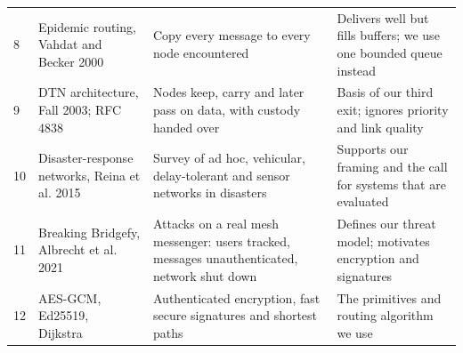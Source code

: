 \begin{longtable}{@{}p{0.5cm}>{\raggedright\arraybackslash}p{3.5cm}p{6.3cm}p{6.0cm}@{}}
8 & Epidemic routing, Vahdat and Becker 2000~\cite{vahdat2000epidemic} & Copy every message to every node encountered & Delivers well but fills buffers; we use one bounded queue instead\\
9 & DTN architecture, Fall 2003; RFC 4838~\cite{fall2003dtn,rfc4838} & Nodes keep, carry and later pass on data, with custody handed over & Basis of our third exit; ignores priority and link quality\\
10 & Disaster-response networks, Reina et al. 2015~\cite{reina2015disaster} & Survey of ad hoc, vehicular, delay-tolerant and sensor networks in disasters & Supports our framing and the call for systems that are evaluated\\
11 & Breaking Bridgefy, Albrecht et al. 2021~\cite{albrecht2021bridgefy} & Attacks on a real mesh messenger: users tracked, messages unauthenticated, network shut down & Defines our threat model; motivates encryption and signatures\\
12 & AES-GCM, Ed25519, Dijkstra~\cite{nist80038d,bernstein2012ed25519,dijkstra1959} & Authenticated encryption, fast secure signatures and shortest paths & The primitives and routing algorithm we use\\
\bottomrule
\end{longtable}
\endgroup

